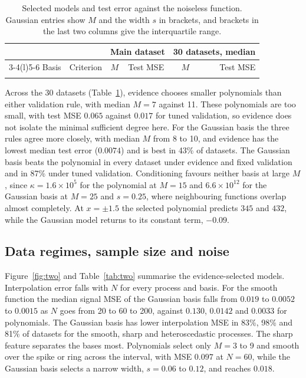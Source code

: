 \documentclass[10pt,a4paper]{article}
\begin{document}
\begin{table}[!htbp]
\centering\footnotesize
\caption{Selected models and test error against the noiseless function. Gaussian entries show $M$ and the width $s$ in brackets, and brackets in the last two columns give the interquartile range.}
\label{tab:one}
\begin{tabular}{@{}llccrr@{}}
\toprule
& & \multicolumn{2}{c}{Main dataset} & \multicolumn{2}{c}{30 datasets, median}\\
\cmidrule(lr){3-4}\cmidrule(l){5-6}
Basis & Criterion & $M$ & Test MSE & $M$ & Test MSE\\
\midrule

\\[-1.6ex]
\bottomrule
\end{tabular}
\end{table}

Across the 30 datasets (Table~\ref{tab:one}), evidence chooses smaller polynomials than either validation rule, with median $M=7$ against 11. These polynomials are too small, with test MSE $0.065$ against $0.017$ for tuned validation, so evidence does not isolate the minimal sufficient degree here. For the Gaussian basis the three rules agree more closely, with median $M$ from 8 to 10, and evidence has the lowest median test error ($0.0074$) and is best in 43\% of datasets. The Gaussian basis beats the polynomial in every dataset under evidence and fixed validation and in 87\% under tuned validation. Conditioning favours neither basis at large $M$, since $\kappa=1.6\times10^{5}$ for the polynomial at $M=15$ and $6.6\times10^{12}$ for the Gaussian basis at $M=25$ and $s=0.25$, where neighbouring functions overlap almost completely. At $x=\pm1.5$ the selected polynomial predicts $345$ and $432$, while the Gaussian model returns to its constant term, $-0.09$.

\subsection{Data regimes, sample size and noise}
Figure~\ref{fig:two} and Table~\ref{tab:two} summarise the evidence-selected models. Interpolation error falls with $N$ for every process and basis. For the smooth function the median signal MSE of the Gaussian basis falls from $0.019$ to $0.0052$ to $0.0015$ as $N$ goes from 20 to 60 to 200, against $0.130$, $0.0142$ and $0.0033$ for polynomials. The Gaussian basis has lower interpolation MSE in 83\%, 98\% and 81\% of datasets for the smooth, sharp and heteroscedastic processes. The sharp feature separates the bases most. Polynomials select only $M=3$ to 9 and smooth over the spike or ring across the interval, with MSE $0.097$ at $N=60$, while the Gaussian basis selects a narrow width, $s=0.06$ to $0.12$, and reaches $0.018$.
\end{document}
